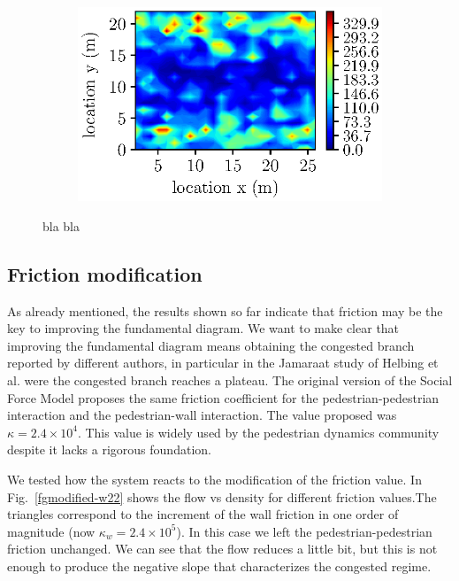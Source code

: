 \begin{figure}[htbp!]
\begin{subfigure}[b]{0.475\columnwidth}
            \label{abswg_width15}
        \end{subfigure}
        \begin{subfigure}[b]{0.475\columnwidth}   
            \centering 
            \caption{}            
            \includegraphics[width=\textwidth]{plots/abswg_width22.eps}
        
            \label{abswg_width22}
           \end{subfigure}        
    
 \caption{bla bla} 

\end{figure}


\subsection{Friction modification}

As already mentioned, the results shown so far indicate that friction may be the key to improving the fundamental diagram. We want to make clear that improving the fundamental diagram means obtaining the congested branch reported by different authors, in particular in the Jamaraat study of Helbing et al. were the congested branch reaches a plateau. The original version of the Social Force Model proposes the same friction coefficient for the pedestrian-pedestrian interaction and the pedestrian-wall interaction. The value proposed was $\kappa = 2.4\times10^{4}$. This value is widely used by the pedestrian dynamics community despite it lacks a rigorous foundation. 

We tested how the system reacts to the modification of the friction value. In Fig.~\ref{fgmodified-w22} shows the flow vs density for different friction values.The triangles correspond to the increment of the wall friction in one order of magnitude (now $\kappa_w = 2.4\times10^{5}$). In this case we left the pedestrian-pedestrian friction unchanged. We can see that the flow reduces a little bit, but this is not enough to produce the negative slope that characterizes the congested regime. 

